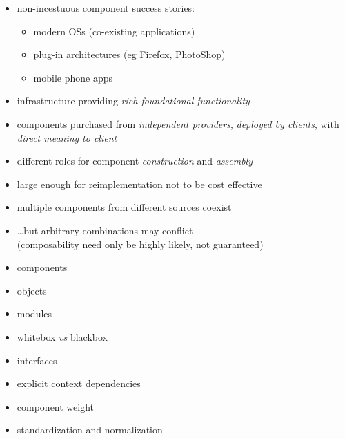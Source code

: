 \documentclass{sepslide-soa-faked} %
\begin{document}
\begin{slide}
\begin{itemize}
\item non-incestuous component success stories:
  \begin{itemize} \itemsep=0pt \parskip=0pt \topsep=0pt
  \item modern OSs (co-existing applications)
  \item plug-in architectures (eg Firefox, PhotoShop)
  \item mobile phone apps
  \end{itemize}
\item infrastructure providing \emph{rich foundational functionality}
\item components purchased from \emph{independent providers},
  \emph{deployed by clients}, with \emph{direct meaning to client}
\item different roles for component \emph{construction} and \emph{assembly}
\item large enough for reimplementation not to be cost effective
\item multiple components from different sources coexist
\item \ldots but arbitrary combinations may conflict \\
  (composability need only be highly likely, not guaranteed)
\end{itemize}
\end{slide}

\begin{slide}
\begin{itemize}
\item components
\item objects
\item modules
\item whitebox \textit{vs} blackbox
\item interfaces
\item explicit context dependencies
\item component weight
\item standardization and normalization
\end{itemize}
\end{slide}
\end{document}
